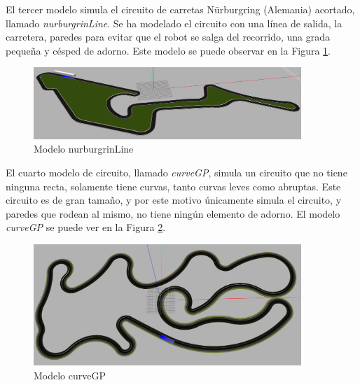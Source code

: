 El tercer modelo simula el circuito de carretas Nürburgring (Alemania) acortado, llamado \textit{nurburgrinLine}. Se ha modelado el circuito con una línea de salida, la carretera, paredes para evitar que el robot se salga del recorrido, una grada pequeña y césped de adorno. Este modelo se puede observar en la Figura \ref{fig.nurburgrin}.\\

\begin{figure}
  \begin{center}
    \includegraphics[width=0.9\textwidth]{figures/Infraestructura/circuit_Nurburgrin.png}
		\caption{Modelo nurburgrinLine}
		\label{fig.nurburgrin}
		\end{center}
\end{figure}

El cuarto modelo de circuito, llamado \textit{curveGP}, simula un circuito que no tiene ninguna recta, solamente tiene curvas, tanto curvas leves como abruptas. Este circuito es de gran tamaño, y por este motivo únicamente simula el circuito, y paredes que rodean al mismo, no tiene ningún elemento de adorno. El modelo \textit{curveGP} se puede ver en la Figura \ref{fig.curveGP}.\\


\begin{figure}
  \begin{center}
    \includegraphics[width=0.9\textwidth]{figures/Infraestructura/circuit_CurveGP.png}
		\caption{Modelo curveGP}
		\label{fig.curveGP}
		\end{center}
\end{figure}

